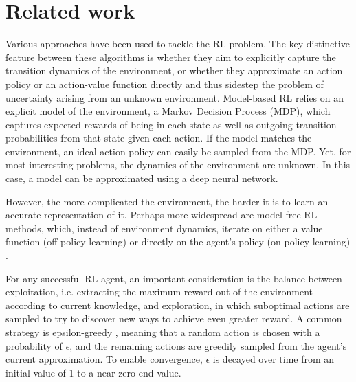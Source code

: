 \documentclass[10pt,journal,compsoc]{IEEEtran}
\begin{document}
\section{Related work}
Various approaches have been used to tackle the RL problem.
The key distinctive feature between these algorithms is whether they aim to explicitly capture the transition dynamics of the environment, or whether they approximate an action policy or an action-value function directly and thus sidestep the problem of uncertainty arising from an unknown environment.
Model-based RL relies on an explicit model of the environment, a Markov Decision Process (MDP), which captures expected rewards of being in each state as well as outgoing transition probabilities from that state given each action. If the model matches the environment, an ideal action policy can easily be sampled from the MDP. Yet, for most interesting problems, the dynamics of the environment are unknown. In this case, a model can be approximated using a deep neural network.

However, the more complicated the environment, the harder it is to learn an accurate representation of it. Perhaps more widespread are model-free RL methods, which, instead of environment dynamics, iterate on either a value function (off-policy learning) \cite{watkins1989learning} or directly on the agent's policy (on-policy learning) \cite{sutton1999policy}.

For any successful RL agent, an important consideration is the balance between exploitation, i.e. extracting the maximum reward out of the environment according to current knowledge, and exploration, in which suboptimal actions are sampled to try to discover new ways to achieve even greater reward. A common strategy is epsilon-greedy \cite{sutton1998reinforcement}, meaning that a random action is chosen with a probability of $\epsilon$, and the remaining actions are greedily sampled from the agent's current approximation. To enable convergence, $\epsilon$ is decayed over time from an initial value of 1 to a near-zero end value.
\end{document}
